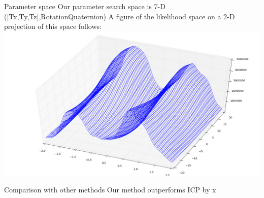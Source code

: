 \documentclass[final]{beamer}
\begin{document}
\begin{frame}{}
\begin{textblock}{27}
\begin{block}{Parameter space}
Our parameter search space is 7-D ([Tx,Ty,Tz],RotationQuaternion)
A figure of the likelihood space on a 2-D projection of this space follows:
\includegraphics[width=10in]{LLProjection.png}
\end{block}

\begin{block}{Comparison with other methods}
Our method outperforms ICP by x%


\end{block}
\end{textblock}
\end{frame}
\end{document}
